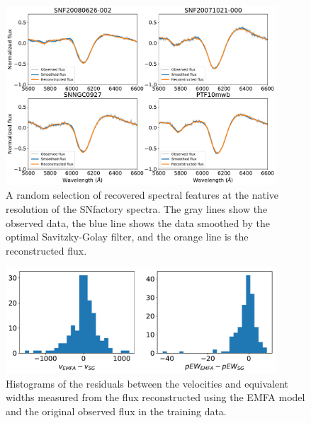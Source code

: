 \begin{figure}[htbp]
    \centering
    \includegraphics[width=0.9\textwidth]{figures/si_feat_pca/example_reconstruction.pdf}
    \caption{A random selection of recovered spectral features at the native resolution of the SNfactory spectra. The gray lines show the observed data, the blue line shows the data smoothed by the optimal Savitzky-Golay filter, and the orange line is the reconstructed flux.}
    \label{feature_recovery}
\end{figure}

\begin{figure}[htbp]
    \centering
    \includegraphics[width=0.9\textwidth]{figures/si_feat_pca/snf_recovery_resids.pdf}
    \caption{Histograms of the residuals between the velocities and equivalent widths measured from the flux reconstructed using the EMFA model and the original observed flux in the training data.}
    \label{snf_hist_resids_native_resolution}
\end{figure}

